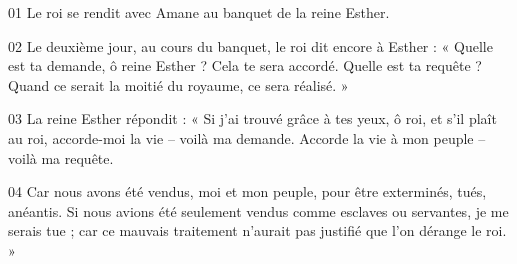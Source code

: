 01 Le roi se rendit avec Amane au banquet de la reine Esther.

02 Le deuxième jour, au cours du banquet, le roi dit encore à Esther : « Quelle est ta demande, ô reine Esther ? Cela te sera accordé. Quelle est ta requête ? Quand ce serait la moitié du royaume, ce sera réalisé. »

03 La reine Esther répondit : « Si j’ai trouvé grâce à tes yeux, ô roi, et s’il plaît au roi, accorde-moi la vie – voilà ma demande. Accorde la vie à mon peuple – voilà ma requête.

04 Car nous avons été vendus, moi et mon peuple, pour être exterminés, tués, anéantis. Si nous avions été seulement vendus comme esclaves ou servantes, je me serais tue ; car ce mauvais traitement n’aurait pas justifié que l’on dérange le roi. »
